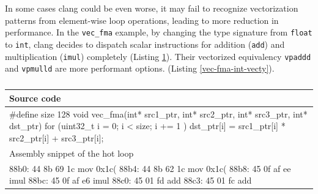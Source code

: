 \documentclass[logo,bsc,singlespacing,parskip]{infthesis}
\newcommand{\dtfloat}{\texttt{float} }
\newenvironment{VerbatimCompact}
  {\vspace*{-2.5mm}\VerbatimEnvironment
   \par\Verbatim}
  {\endVerbatim\vspace*{-2.4mm}}
\begin{document}
In some cases clang could be even worse, it may fail to recognize vectorization
patterns from element-wise loop operations, leading to more reduction in
performance. In the \texttt{vec\_fma} example, by changing the type signature
from \dtfloat to \texttt{int}, clang decides to dispatch scalar
instructions for addition (\texttt{add}) and multiplication (\texttt{imul})
completely (Listing \ref{vec-fma-int-auto}). Their vectorized equivalency
\texttt{vpaddd} and \texttt{vpmulld} are more performant options. (Listing
\ref{vec-fma-int-vecty}).

\begin{table}[ht]\captionsetup{name=Listing}
\begin{tabular}{>{\raggedright\arraybackslash}p{14cm}}
    Source code\\
    \midrule
    \begin{VerbatimCompact}
#define size 128
void vec_fma(int* src1_ptr, int* src2_ptr, 
             int* src3_ptr, int* dst_ptr) {
    for (uint32_t i = 0; i < size; i += 1 ){
        dst_ptr[i] = src1_ptr[i] * src2_ptr[i] + src3_ptr[i];
    }
}
    \end{VerbatimCompact}
    \\
    Assembly snippet of the hot loop\\
    \midrule
    \begin{VerbatimCompact}
88b0: 44 8b 69 1c  mov    0x1c(%
88b4: 44 8b 62 1c  mov    0x1c(%
88b8: 45 0f af ee  imul   %
88bc: 45 0f af e6  imul   %
88c0: 45 01 fd     add    %
88c3: 45 01 fc     add    %
    \end{VerbatimCompact}
    \\
\end{tabular}
\caption{}
\label{vec-fma-int-auto}
\end{table}
\end{document}
